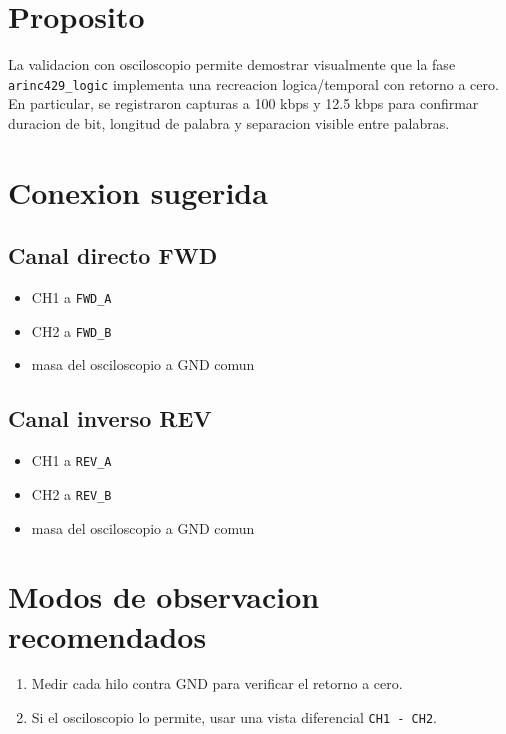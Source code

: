 \documentclass[12pt,a4paper,oneside]{report}
\begin{document}
\section{Proposito}

La validacion con osciloscopio permite demostrar visualmente que la fase \texttt{arinc429\_logic} implementa una recreacion logica/temporal con retorno a cero. En particular, se registraron capturas a 100 kbps y 12.5 kbps para confirmar duracion de bit, longitud de palabra y separacion visible entre palabras.

\section{Conexion sugerida}

\subsection{Canal directo FWD}

\begin{itemize}[leftmargin=1.2cm]
    \item CH1 a \texttt{FWD\_A}
    \item CH2 a \texttt{FWD\_B}
    \item masa del osciloscopio a GND comun
\end{itemize}

\subsection{Canal inverso REV}

\begin{itemize}[leftmargin=1.2cm]
    \item CH1 a \texttt{REV\_A}
    \item CH2 a \texttt{REV\_B}
    \item masa del osciloscopio a GND comun
\end{itemize}

\section{Modos de observacion recomendados}

\begin{enumerate}[leftmargin=1.2cm]
    \item Medir cada hilo contra GND para verificar el retorno a cero.
    \item Si el osciloscopio lo permite, usar una vista diferencial \texttt{CH1 - CH2}.
\end{enumerate}
\end{document}
